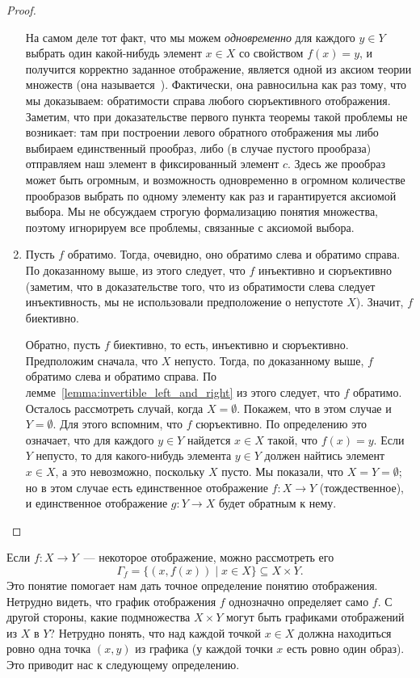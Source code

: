 \begin{proof}
\begin{enumerate}
{\small
\begin{remark}\label{remark:axiom-of-choice}
На самом деле тот факт, что мы можем {\it одновременно} для каждого
$y\in Y$ выбрать один какой-нибудь элемент $x\in X$ со свойством
$f(x)=y$, и получится корректно заданное отображение, является одной
из аксиом теории множеств (она
называется~). Фактически,
она равносильна как раз тому, что мы доказываем: обратимости справа
любого сюръективного отображения. Заметим, что при доказательстве
первого пункта теоремы такой проблемы не возникает: там при построении
левого обратного отображения мы либо выбираем единственный прообраз,
либо (в случае пустого прообраза) отправляем наш элемент в
фиксированный элемент $c$. Здесь же прообраз может быть огромным, и
возможность одновременно в огромном количестве прообразов выбрать по
одному элементу как раз и гарантируется аксиомой выбора. Мы не
обсуждаем строгую формализацию понятия множества, поэтому игнорируем
все проблемы, связанные с аксиомой выбора.
\end{remark}
}
\item Пусть $f$ обратимо. Тогда, очевидно, оно обратимо слева и
  обратимо справа. По доказанному выше, из этого следует, что $f$
  инъективно и сюръективно (заметим, что в доказательстве того, что из
  обратимости слева следует инъективность, мы не использовали
  предположение о непустоте $X$). Значит, $f$ биективно.

  Обратно, пусть $f$ биективно, то есть, инъективно и
  сюръективно. Предположим сначала, что $X$ непусто. Тогда, по
  доказанному выше, $f$ обратимо слева и обратимо справа. По
  лемме~\ref{lemma:invertible_left_and_right} из этого следует, что
  $f$ обратимо. Осталось рассмотреть случай, когда $X =
  \emptyset$. Покажем, что в этом случае и $Y = \emptyset$. Для этого
  вспомним, что $f$ сюръективно. По определению это означает, что для
  каждого $y\in Y$ найдется $x\in X$ такой, что $f(x) = y$. Если $Y$
  непусто, то для какого-нибудь элемента $y\in Y$ должен найтись
  элемент $x\in X$, а это невозможно, поскольку $X$ пусто. Мы
  показали, что $X = Y = \emptyset$; но в этом случае есть
  единственное отображение $f\colon X\to Y$ (тождественное), и
  единственное отображение $g\colon Y\to X$ будет обратным к нему.
\end{enumerate}
\end{proof}

Если $f\colon X\to Y$~--- некоторое отображение, можно рассмотреть его
$$
\Gamma_f=\{(x,f(x))\mid x\in X\}\subseteq X\times Y.
$$
Это понятие помогает нам дать точное определение понятию
отображения. Нетрудно видеть, что график отображения $f$ однозначно
определяет само $f$. С другой стороны, какие подмножества $X\times Y$
могут быть графиками отображений из $X$ в $Y$? Нетрудно понять, что
над каждой точкой $x\in X$ должна находиться ровно одна точка $(x,y)$
из графика (у каждой точки $x$ есть ровно один образ). Это приводит
нас к следующему определению.

